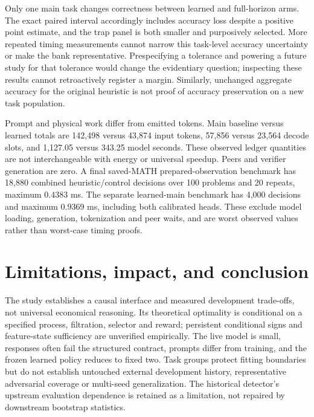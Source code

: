 \documentclass{article}
\begin{document}
Only one main task changes correctness between learned and full-horizon arms.
The exact paired interval accordingly includes accuracy loss despite a
positive point estimate, and the trap panel is both smaller and purposively
selected. More repeated timing measurements cannot narrow this task-level
accuracy uncertainty or make the bank representative. Prespecifying a tolerance
and powering a future study for that tolerance would change the evidentiary
question; inspecting these results cannot retroactively register a margin.
Similarly, unchanged aggregate accuracy for the original heuristic is not
proof of accuracy preservation on a new task population.

Prompt and physical work differ from emitted tokens. Main baseline versus
learned totals are 142,498 versus 43,874 input tokens, 57,856 versus 23,564
decode slots, and 1,127.05 versus 343.25 model seconds. These observed ledger
quantities are not interchangeable with energy or universal speedup. Peers and
verifier generation are zero. A final saved-MATH prepared-observation benchmark
has 18,880 combined heuristic/control decisions over 100 problems and 20
repeats, maximum 0.4383 ms. The separate learned-main benchmark has 4,000
decisions and maximum 0.9369 ms, including both calibrated heads. These exclude
model loading, generation, tokenization and peer waits, and are worst observed
values rather than worst-case timing proofs.

\section{Limitations, impact, and conclusion}
\label{sec:limits}
The study establishes a causal interface and measured development trade-offs,
not universal economical reasoning. Its theoretical optimality is conditional
on a specified process, filtration, selector and reward; persistent conditional
signs and feature-state sufficiency are unverified empirically. The live model
is small, responses often fail the structured contract, prompts differ from
training, and the frozen learned policy reduces to fixed two. Task groups
protect fitting boundaries but do not establish untouched external development
history, representative adversarial coverage or multi-seed generalization.
The historical detector's upstream evaluation dependence is retained as a
limitation, not repaired by downstream bootstrap statistics.
\end{document}

